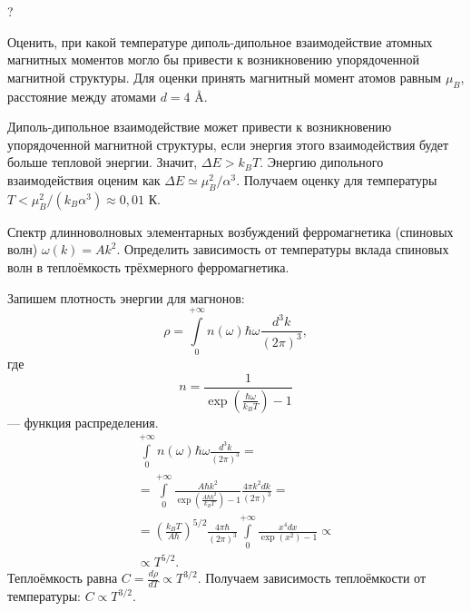 \documentclass[10pt,landscape,a4paper]{article}
\begin{document}
\begin{multicols*}{5}
\begin{hiProb}[0-12-2]
\end{hiProb}
\begin{sol}
?
\end{sol}
\begin{hiProb}[0-13-1]
Оценить, при какой температуре диполь-дипольное взаимодействие атомных магнитных моментов могло бы привести к возникновению упорядоченной магнитной структуры. Для оценки принять магнитный момент атомов равным $\mu_B$, расстояние между атомами $d=4\text{ \AA}$.
\end{hiProb}
\begin{sol}
Диполь-дипольное взаимодействие может привести к
возникновению упорядоченной магнитной структуры,
если энергия этого взаимодействия будет больше
тепловой энергии. Значит, $\Delta E >k_B T$. Энергию
дипольного взаимодействия оценим как
$\Delta E \simeq \mu_B^2 /\alpha^3$. Получаем оценку
для температуры
$T<\mu_B^2 / \left(k_B \alpha^3\right) \approx 0,01 \text{ К}$.
\end{sol}
\begin{hiProb}[0-13-2]
	Спектр длинноволновых элементарных возбуждений ферромагнетика (спиновых волн) $\omega(k)=Ak^2$. Определить зависимость от температуры вклада спиновых волн в теплоёмкость трёхмерного ферромагнетика.
\end{hiProb}
\begin{sol}
Запишем плотность энергии для магнонов:
\[
	\rho = \int\limits_{0}^{+\infty} n(\omega) 
	\hbar \omega \frac{d^3k}{\left( 2\pi \right) ^3}
,\] 
где
\[
	n= \frac{1}{\exp \left( \frac{\hbar \omega}{k_B T} \right) -1}
\]
--- функция распределения.
\begin{multline*}
	\int\limits_{0}^{+\infty} n(\omega)
	\hbar \omega \frac{d^3k}{\left( 2\pi \right) ^3}=\\=
	\int\limits_{0}^{+\infty}  
	\frac{A \hbar  k^2}{\exp \left( \frac{A\hbar k^2}{k_B T} \right) -1} \frac{4\pi k^2 dk}{\left( 2\pi \right) ^3}=\\= \left( \frac{k_B T}{A\hbar } \right) ^{5 /2}
	\frac{4\pi \hbar }{\left( 2\pi \right) ^3}
	\int\limits_{0}^{+\infty} 
	\frac{x^4 dx}{\exp \left(x^2\right)-1}
	\propto\\ \propto T^{5 /2}
.\end{multline*} 
Теплоёмкость равна $\displaystyle C=\frac{d\rho}{dT}
 \propto T^{3 /2}$. Получаем зависимость теплоёмкости
 от температуры: $C \propto T^{3 /2}$.
\end{sol}
\end{multicols*}
\end{document}
